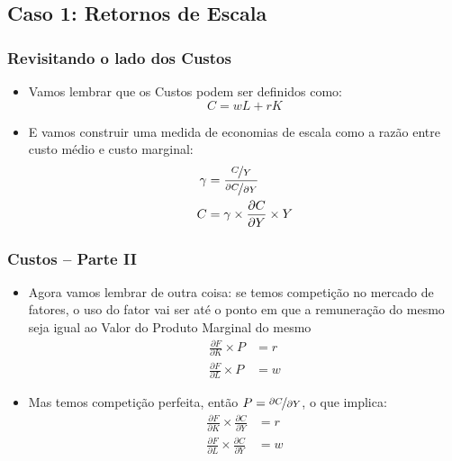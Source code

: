 \documentclass{beamer}
\begin{document}
\subsection{Caso 1: Retornos de Escala}
\begin{frame}[fragile]\frametitle{Revisitando o lado dos Custos}
    \begin{itemize}
        \item Vamos lembrar que os Custos podem ser definidos como:
        \begin{equation*}
            C=wL+rK
        \end{equation*}
        \item E vamos construir uma medida de economias de escala como a razão entre custo médio e custo marginal:
        \begin{align*}
            \gamma&=\frac{\nicefrac{C}{Y}}{\nicefrac{\partial C}{\partial Y}} \\
            C&=\gamma \times \frac{\partial C}{\partial Y} \times Y
        \end{align*}
    \end{itemize}


\end{frame}
\begin{frame}[fragile]\frametitle{Custos -- Parte II}
    \begin{itemize}
        \item Agora vamos lembrar de outra coisa: se temos competição no mercado de fatores, o uso do fator vai ser até o ponto em que a remuneração do mesmo seja igual ao Valor do Produto Marginal do mesmo
        \begin{align*}
            \frac{\partial F}{\partial K}\times P&=r \\
            \frac{\partial F}{\partial L}\times P&=w
        \end{align*}
        \item Mas temos competição perfeita, então $P=\nicefrac{\partial C}{\partial Y}$, o que implica:
        \begin{align*}
            \frac{\partial F}{\partial K}\times \frac{\partial C}{\partial Y}&=r \\
            \frac{\partial F}{\partial L}\times \frac{\partial C}{\partial Y}&=w
        \end{align*}
    \end{itemize}


\end{frame}
\end{document}
